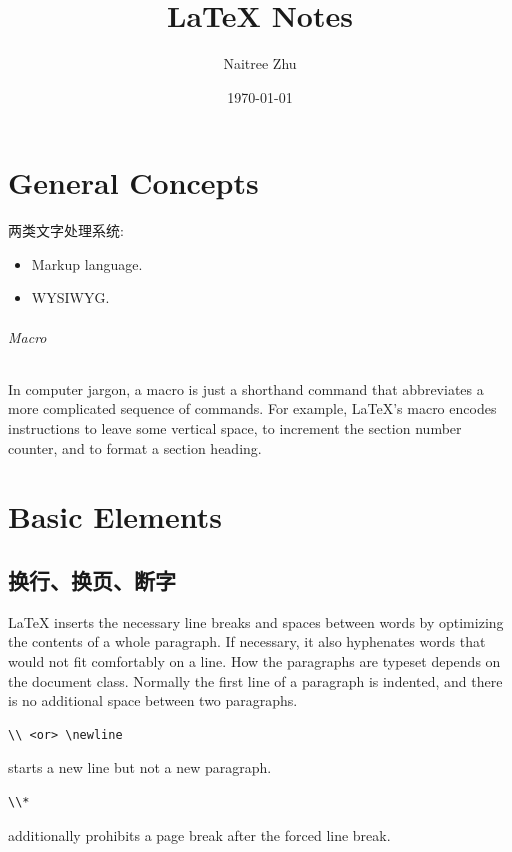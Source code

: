\documentclass[a4paper,oneside]{book}
\title{\vspace{-20ex}\Huge\LaTeX{} Notes}
\author{Naitree Zhu}
\date{\today}
\newcommand{\command}[1]{\PVerb{#1}}
\begin{document}
\maketitle

{
  \hypersetup{linkcolor=black}%
  \tableofcontents
}

\part{General Concepts}
两类文字处理系统:
\begin{itemize}
  \item Markup language.
  \item WYSIWYG.
\end{itemize}

\paragraph{Macro}
In computer jargon, a macro is just a shorthand command that abbreviates a more complicated sequence of commands. For example, \LaTeX{}'s \command{\section} macro encodes instructions to leave some vertical space, to increment the section number counter, and to format a section heading.


\part{Basic Elements}
\chapter{换行、换页、断字}
\LaTeX{} inserts the necessary line breaks and spaces between words by optimizing the contents of a whole paragraph. If necessary, it also hyphenates words that would not fit comfortably on a line. How the paragraphs are typeset depends on the document class. Normally the first line of a paragraph is indented, and there is no additional space between two paragraphs.

\begin{lstlisting}
\\ <or> \newline
\end{lstlisting}
starts a new line but not a new paragraph.
\begin{lstlisting}
\\*
\end{lstlisting}
additionally prohibits a page break after the forced line break.
\end{document}
